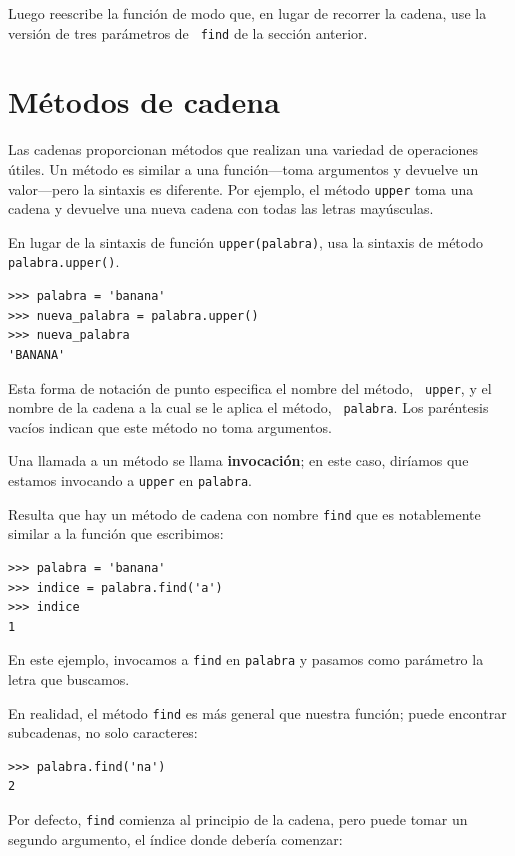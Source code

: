 \documentclass[10pt]{book}
\begin{document}
Luego reescribe la función de modo que, en lugar de
recorrer la cadena, use la versión de tres parámetros de {\tt
find} de la sección anterior.


\section{Métodos de cadena}
\label{optional}

Las cadenas proporcionan métodos que realizan una variedad de operaciones útiles.
Un método es similar a una función---toma argumentos y
devuelve un valor---pero la sintaxis es diferente.  Por ejemplo, el
método {\tt upper} toma una cadena y devuelve una nueva cadena con
todas las letras mayúsculas.

En lugar de la sintaxis de función {\tt upper(palabra)}, usa
la sintaxis de método {\tt palabra.upper()}.

\begin{verbatim}
>>> palabra = 'banana'
>>> nueva_palabra = palabra.upper()
>>> nueva_palabra
'BANANA'
\end{verbatim}
%
Esta forma de notación de punto especifica el nombre del método, {\tt
upper}, y el nombre de la cadena a la cual se le aplica el método, {\tt
palabra}.  Los paréntesis vacíos indican que este método no toma
argumentos.

Una llamada a un método se llama {\bf invocación}; en este caso,
diríamos que estamos invocando a {\tt upper} en {\tt palabra}.

Resulta que hay un método de cadena con nombre {\tt find} que
es notablemente similar a la función que escribimos:

\begin{verbatim}
>>> palabra = 'banana'
>>> indice = palabra.find('a')
>>> indice
1
\end{verbatim}
%
En este ejemplo, invocamos a {\tt find} en {\tt palabra} y pasamos
como parámetro la letra que buscamos.

En realidad, el método {\tt find} es más general que nuestra función;
puede encontrar subcadenas, no solo caracteres:

\begin{verbatim}
>>> palabra.find('na')
2
\end{verbatim}
%
Por defecto, {\tt find} comienza al principio de la cadena, pero
puede tomar un segundo argumento, el índice donde debería comenzar:
\end{document}
